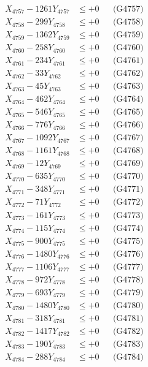 \documentclass[a4paper,10pt]{article}
\begin{document}
{\begin{align}
X_{4757} - 1261Y_{4757} &\leq +0 && \text{(G4757)} \\
X_{4758} - 299Y_{4758} &\leq +0 && \text{(G4758)} \\
X_{4759} - 1362Y_{4759} &\leq +0 && \text{(G4759)} \\
X_{4760} - 258Y_{4760} &\leq +0 && \text{(G4760)} \\
\allowbreak
X_{4761} - 234Y_{4761} &\leq +0 && \text{(G4761)} \\
X_{4762} - 33Y_{4762} &\leq +0 && \text{(G4762)} \\
X_{4763} - 45Y_{4763} &\leq +0 && \text{(G4763)} \\
X_{4764} - 462Y_{4764} &\leq +0 && \text{(G4764)} \\
X_{4765} - 546Y_{4765} &\leq +0 && \text{(G4765)} \\
X_{4766} - 776Y_{4766} &\leq +0 && \text{(G4766)} \\
X_{4767} - 1092Y_{4767} &\leq +0 && \text{(G4767)} \\
X_{4768} - 1161Y_{4768} &\leq +0 && \text{(G4768)} \\
X_{4769} - 12Y_{4769} &\leq +0 && \text{(G4769)} \\
X_{4770} - 635Y_{4770} &\leq +0 && \text{(G4770)} \\
\allowbreak
X_{4771} - 348Y_{4771} &\leq +0 && \text{(G4771)} \\
X_{4772} - 71Y_{4772} &\leq +0 && \text{(G4772)} \\
X_{4773} - 161Y_{4773} &\leq +0 && \text{(G4773)} \\
X_{4774} - 115Y_{4774} &\leq +0 && \text{(G4774)} \\
X_{4775} - 900Y_{4775} &\leq +0 && \text{(G4775)} \\
X_{4776} - 1480Y_{4776} &\leq +0 && \text{(G4776)} \\
X_{4777} - 1106Y_{4777} &\leq +0 && \text{(G4777)} \\
X_{4778} - 972Y_{4778} &\leq +0 && \text{(G4778)} \\
X_{4779} - 693Y_{4779} &\leq +0 && \text{(G4779)} \\
X_{4780} - 1480Y_{4780} &\leq +0 && \text{(G4780)} \\
\allowbreak
X_{4781} - 318Y_{4781} &\leq +0 && \text{(G4781)} \\
X_{4782} - 1417Y_{4782} &\leq +0 && \text{(G4782)} \\
X_{4783} - 190Y_{4783} &\leq +0 && \text{(G4783)} \\
X_{4784} - 288Y_{4784} &\leq +0 && \text{(G4784)} \\

\end{align}}
\end{document}
